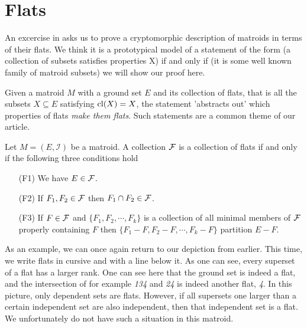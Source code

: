 \newpage

\section{Flats}

An excercise in \cite[35]{oxley1} asks us to prove a cryptomorphic description of matroids in terms of their flats. We think it is a prototypical model of a statement of the form (a collection of subsets satisfies properties X) if and only if (it is some well known family of matroid subsets) we will show our proof here.

    Given a matroid $M$ with a ground set $E$ and its collection of flats, that is all the subsets $X \subseteq E$ satisfying $\mathrm{cl}(X) = X$, the statement 'abstracts out' which properties of flats \textit{make them flats}. Such statements are a common theme of our article.

\begin{theorem}
    Let $M = (E, \mathcal{I})$ be a matroid. A collection $\mathcal{F}$ is a collection of flats if and only if the following three conditions hold

    \begin{enumerate}
        \item[(F1)] We have $E \in \mathcal{F}$.
        \item[(F2)] If $F_1, F_2 \in \mathcal{F}$ then $F_1 \cap F_2 \in \mathcal{F}$.
        \item[(F3)] If $F \in \mathcal{F}$ and $\{F_1, F_2, \cdots, F_k\}$ is a collection of all minimal members of $\mathcal{F}$ properly containing $F$ then $\{F_1-F, F_2-F, \cdots, F_k - F\}$ partition $E-F$.
        
    \end{enumerate}
        
\end{theorem}

As an example, we can once again return to our depiction from earlier. This time, we write flats in cursive and with a line below it. As one can see, every superset of a flat has a larger rank. One can see here that the ground set is indeed a flat, and the intersection of for example \textit{134} and \textit{24} is indeed another flat, \textit{4}. In this picture, only dependent sets are flats. However, if all supersets one larger than a certain independent set are also independent, then that independent set is a flat. We unfortunately do not have such a situation in this matroid. 

